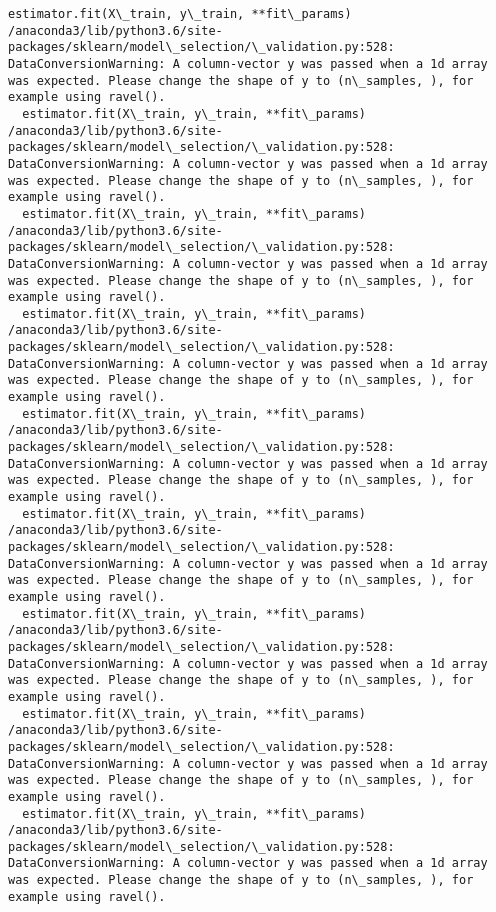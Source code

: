 \documentclass[11pt]{article}
\begin{document}
\begin{Verbatim}[commandchars=\\\{\}]
  estimator.fit(X\_train, y\_train, **fit\_params)
/anaconda3/lib/python3.6/site-packages/sklearn/model\_selection/\_validation.py:528: DataConversionWarning: A column-vector y was passed when a 1d array was expected. Please change the shape of y to (n\_samples, ), for example using ravel().
  estimator.fit(X\_train, y\_train, **fit\_params)
/anaconda3/lib/python3.6/site-packages/sklearn/model\_selection/\_validation.py:528: DataConversionWarning: A column-vector y was passed when a 1d array was expected. Please change the shape of y to (n\_samples, ), for example using ravel().
  estimator.fit(X\_train, y\_train, **fit\_params)
/anaconda3/lib/python3.6/site-packages/sklearn/model\_selection/\_validation.py:528: DataConversionWarning: A column-vector y was passed when a 1d array was expected. Please change the shape of y to (n\_samples, ), for example using ravel().
  estimator.fit(X\_train, y\_train, **fit\_params)
/anaconda3/lib/python3.6/site-packages/sklearn/model\_selection/\_validation.py:528: DataConversionWarning: A column-vector y was passed when a 1d array was expected. Please change the shape of y to (n\_samples, ), for example using ravel().
  estimator.fit(X\_train, y\_train, **fit\_params)
/anaconda3/lib/python3.6/site-packages/sklearn/model\_selection/\_validation.py:528: DataConversionWarning: A column-vector y was passed when a 1d array was expected. Please change the shape of y to (n\_samples, ), for example using ravel().
  estimator.fit(X\_train, y\_train, **fit\_params)
/anaconda3/lib/python3.6/site-packages/sklearn/model\_selection/\_validation.py:528: DataConversionWarning: A column-vector y was passed when a 1d array was expected. Please change the shape of y to (n\_samples, ), for example using ravel().
  estimator.fit(X\_train, y\_train, **fit\_params)
/anaconda3/lib/python3.6/site-packages/sklearn/model\_selection/\_validation.py:528: DataConversionWarning: A column-vector y was passed when a 1d array was expected. Please change the shape of y to (n\_samples, ), for example using ravel().
  estimator.fit(X\_train, y\_train, **fit\_params)
/anaconda3/lib/python3.6/site-packages/sklearn/model\_selection/\_validation.py:528: DataConversionWarning: A column-vector y was passed when a 1d array was expected. Please change the shape of y to (n\_samples, ), for example using ravel().
  estimator.fit(X\_train, y\_train, **fit\_params)
/anaconda3/lib/python3.6/site-packages/sklearn/model\_selection/\_validation.py:528: DataConversionWarning: A column-vector y was passed when a 1d array was expected. Please change the shape of y to (n\_samples, ), for example using ravel().

\end{Verbatim}
\end{document}

